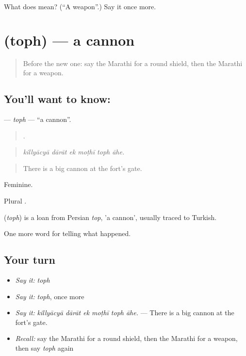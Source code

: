 \begin{tcolorbox}[breakable,colback=teal!4,colframe=teal!35!black,title={Before you move on}]
What does  mean? (\textquotedblleft{}A weapon\textquotedblright{}.) Say it once more.
\end{tcolorbox}
\section[\texorpdfstring{\mr{तोफ} (toph)}{तोफ (toph)}]{ (toph) — a cannon}

\label{lesson:MR-C329-toph}



\begin{quote}
Before the new one: say the Marathi for a round shield, then the Marathi for a weapon.
\end{quote}

\subsection*{You'll want to know: }
\textbf{} — \emph{toph} — \textquotedblleft{}a cannon\textquotedblright{}.

\begin{quote}
     .
\end{quote}

\begin{quote}
\emph{killyācyā dārāt ek moṭhī toph āhe.}
\end{quote}

\begin{quote}
There is a big cannon at the fort's gate.
\end{quote}

Feminine.

Plural .

\begin{cousinweb}
\textbf{} (\emph{toph}) is a loan from Persian \emph{top}, 'a cannon', usually traced to Turkish.
\end{cousinweb}

\begin{grammarlens}[title={What you've built}]
One more word for telling what happened.
\end{grammarlens}

\subsection*{Your turn}
\begin{itemize}
\raggedright
  \item \emph{Say it:} \emph{toph}
  \item \emph{Say it:} \emph{toph}, once more
  \item \emph{Say it:} \emph{killyācyā dārāt ek moṭhī toph āhe.} — There is a big cannon at the fort's gate.
  \item \emph{Recall:} say the Marathi for a round shield, then the Marathi for a weapon, then say \emph{toph} again
\end{itemize}

